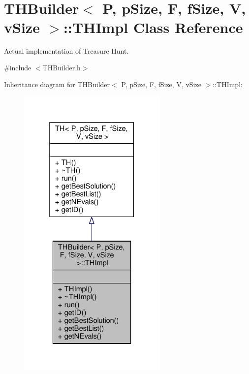 \hypertarget{classTHBuilder_1_1THImpl}{}\section{T\+H\+Builder$<$ P, p\+Size, F, f\+Size, V, v\+Size $>$\+:\+:T\+H\+Impl Class Reference}
\label{classTHBuilder_1_1THImpl}


Actual implementation of Treasure Hunt.  




{\ttfamily \#include $<$T\+H\+Builder.\+h$>$}



Inheritance diagram for T\+H\+Builder$<$ P, p\+Size, F, f\+Size, V, v\+Size $>$\+:\+:T\+H\+Impl\+:
\nopagebreak
\begin{figure}[H]
\begin{center}
\leavevmode
\includegraphics[width=208pt]{classTHBuilder_1_1THImpl__inherit__graph}
\end{center}
\end{figure}



